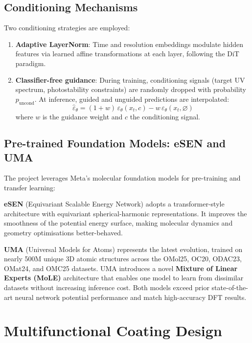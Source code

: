 \documentclass[11pt,a4paper]{article}
\begin{document}
\subsection{Conditioning Mechanisms}

Two conditioning strategies are employed:
\begin{enumerate}[leftmargin=2em]
  \item \textbf{Adaptive LayerNorm}: Time and resolution embeddings
    modulate hidden features via learned affine transformations at each
    layer, following the DiT paradigm.
  \item \textbf{Classifier-free guidance}: During training, conditioning
    signals (target UV spectrum, photostability constraints) are randomly
    dropped with probability $p_\text{uncond}$. At inference, guided and
    unguided predictions are interpolated:
    \begin{equation}
      \hat{\varepsilon}_\theta = (1 + w)\,\varepsilon_\theta(x_t, c) -
        w\,\varepsilon_\theta(x_t, \varnothing)
    \end{equation}
    where $w$ is the guidance weight and $c$ the conditioning signal.
\end{enumerate}

\subsection{Pre-trained Foundation Models: eSEN and UMA}

The project leverages Meta's molecular foundation models for pre-training
and transfer learning:

\textbf{eSEN} (Equivariant Scalable Energy Network) adopts a
transformer-style architecture with equivariant spherical-harmonic
representations. It improves the smoothness of the potential energy surface,
making molecular dynamics and geometry optimisations better-behaved.

\textbf{UMA} (Universal Models for Atoms) represents the latest evolution,
trained on nearly 500M unique 3D atomic structures across the OMol25, OC20,
ODAC23, OMat24, and OMC25 datasets. UMA introduces a novel
\textbf{Mixture of Linear Experts (MoLE)} architecture that enables one
model to learn from dissimilar datasets without increasing inference cost.
Both models exceed prior state-of-the-art neural network potential
performance and match high-accuracy DFT results.

\section{Multifunctional Coating Design}
\end{document}
